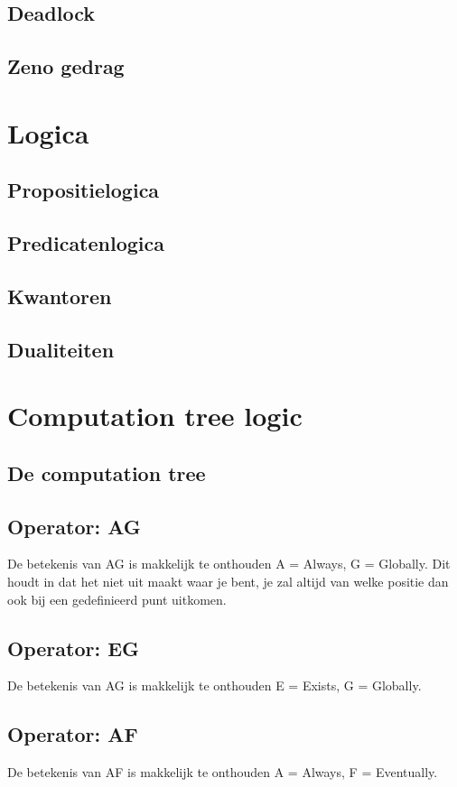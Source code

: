 \documentclass{article}%
\begin{document}
\subsection{Deadlock}
\subsection{Zeno gedrag}
\section{Logica}
\subsection{Propositielogica}
\subsection{Predicatenlogica}
\subsection{Kwantoren}
\subsection{Dualiteiten}
\section{Computation tree logic}
\subsection{De computation tree}
\subsection{Operator: AG}
De betekenis van AG is makkelijk te onthouden A = Always, G = Globally. Dit houdt in dat het niet uit maakt waar je bent, je zal altijd van welke positie dan ook bij een gedefinieerd punt uitkomen.

\subsection{Operator: EG}
De betekenis van AG is makkelijk te onthouden E = Exists, G = Globally.

\subsection{Operator: AF}
De betekenis van AF is makkelijk te onthouden A = Always, F = Eventually.
\end{document}
